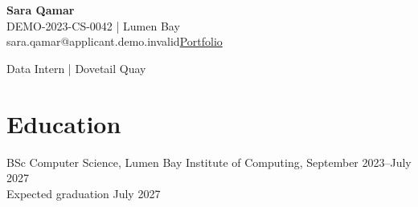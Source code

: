 
{\LARGE\textbf{Sara Qamar}}\\
DEMO-2023-CS-0042 | Lumen Bay\\
sara.qamar@applicant.demo.invalid\quad \href{https://portfolio.demo.invalid/sara-qamar}{Portfolio}
\par\small{Data Intern | Dovetail Quay}\par
\section{Education}
BSc Computer Science, Lumen Bay Institute of Computing, September 2023–July 2027\\
Expected graduation July 2027
